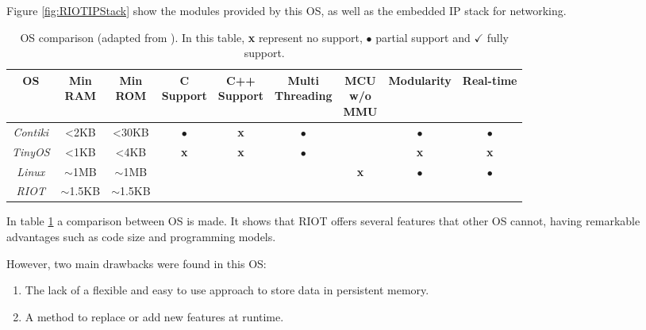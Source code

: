 Figure \ref{fig:RIOTIPStack} show the modules provided by this OS, as well as the embedded IP stack for networking.

\begin{table}[htb]
	\scriptsize
	\centering
	\caption{OS comparison (adapted from \cite{baccelli2013riot}). In this table, \textbf{x} represent no support, $\bullet$ partial support and $\checkmark$ fully support.}
	\label{tab:OSComparison}
	\begin{tabular}{|c|cccccccc}
		\hline
		\textbf{OS} & 
		\multicolumn{1}{p{0.8cm}|}{\textbf{Min} \newline \textbf{RAM}} &
		\multicolumn{1}{p{0.8cm}|}{\textbf{Min} \newline \textbf{ROM}} &
		\multicolumn{1}{p{1.3cm}|}{\textbf{C} \newline \textbf{Support}} &
		\multicolumn{1}{p{1.3cm}|}{\textbf{C++} \newline \textbf{Support}} &
		\multicolumn{1}{p{1.6cm}|}{\textbf{Multi} \newline \textbf{Threading}} &
		\multicolumn{1}{p{1cm}|}{\textbf{MCU} \newline \textbf{w/o} \newline \textbf{MMU}} &
		\multicolumn{1}{c|}{\textbf{Modularity}} &
		\multicolumn{1}{c|}{\textbf{Real-time}} \\ \hline
		\textit{Contiki} & \textless 2KB & \textless 30KB &$\bullet$ & \textbf{x}       & $\bullet$     & \checkmark     &$\bullet$ &    $\bullet$ \\ \cline{1-1}
		\textit{TinyOS}  & \textless 1KB & \textless 4KB  &\textbf{x}& \textbf{x}       & $\bullet$     & \checkmark     &\textbf{x}&   \textbf{x}\\ \cline{1-1}
		\textit{Linux}   & $\mathtt{\sim}$1MB &$\mathtt{\sim}$1MB&\checkmark & \checkmark       &  \checkmark   & \textbf{x} &$\bullet$   &$\bullet$    \\ \cline{1-1}
		\textit{RIOT} & $\mathtt{\sim}$1.5KB & $\mathtt{\sim}$1.5KB & \checkmark    & \checkmark       & \checkmark & \checkmark & \checkmark & \checkmark  \\ \cline{1-1}
	\end{tabular}
\end{table}

In table \ref{tab:OSComparison} a comparison between OS is made.
It shows that RIOT offers several features that other OS cannot, having remarkable advantages such as code size and programming models.

However, two main drawbacks were found in this OS:
\begin{enumerate}
	\item The lack of a flexible and easy to use approach to store data in persistent memory.
	\item A method to replace or add new features at runtime.
\end{enumerate}

